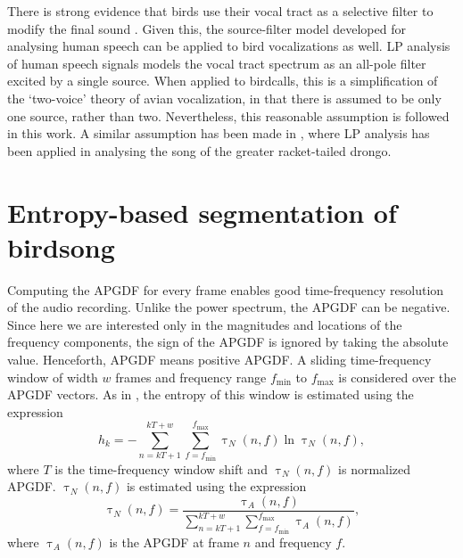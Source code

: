 \documentclass[a4paper]{article}
\begin{document}
There is strong evidence that birds use their vocal tract as a selective filter
to modify the final sound \cite{catchpole}.  Given this, the source-filter model
developed for analysing human speech can be applied to bird vocalizations as
well.  LP analysis of human speech signals models the vocal
tract spectrum as an all-pole filter \cite{makhoul} excited by a single source.
When applied to birdcalls, this is a simplification of the `two-voice' theory of
avian vocalization\cite{catchpole}, in that there is assumed to be only one
source, rather than two. Nevertheless, this reasonable assumption is followed in
this work. A similar assumption has been made in \cite{agnihotri}, where LP
analysis has been applied in analysing the song of the greater racket-tailed
drongo.



\section{Entropy-based segmentation of birdsong}
\label{sec:entropyAlgo}

Computing the APGDF for every frame enables good time-frequency resolution of
the audio recording. Unlike the power spectrum, the APGDF can be negative.
Since here we are interested only in the magnitudes and locations of the
frequency components, the sign of the APGDF is ignored by taking the absolute
value. Henceforth, APGDF means positive APGDF.  A sliding time-frequency window
of width $w$ frames and frequency range $f_{\min}$ to $f_{\max}$ is considered over the
APGDF vectors. As in \cite{wang2013}, the entropy of this window is estimated
using the expression
\begin{equation}
\label{eq:2}
 h_{k}=-\sum_{n=kT+1}^{kT+w}\sum_{f=f_{\min}}^{f_{\max}} \uptau_N(n,f) \ln \uptau_N(n,f),
\end{equation}
where $T$ is the time-frequency window shift and $\uptau_N(n,f)$ is normalized
APGDF. $\uptau_N(n,f)$ is estimated using the expression 
\begin{equation}
\label{eq:3}
\uptau_N(n,f)=\frac {\uptau_A(n,f)}
{\sum_{n=kT+1}^{kT+w}\sum_{f=f_{\min}}^{f_{\max}} \uptau_A(n,f)},
\end{equation}
where $\uptau_A(n,f)$ is the APGDF at frame $n$ and frequency $f$.
\end{document}
